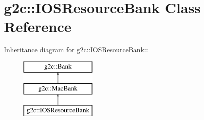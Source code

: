 \hypertarget{classg2c_1_1_i_o_s_resource_bank}{
\section{g2c::IOSResourceBank Class Reference}
\label{classg2c_1_1_i_o_s_resource_bank}
}
Inheritance diagram for g2c::IOSResourceBank::\begin{figure}[H]
\begin{center}
\leavevmode
\includegraphics[height=3cm]{classg2c_1_1_i_o_s_resource_bank}
\end{center}
\end{figure}
